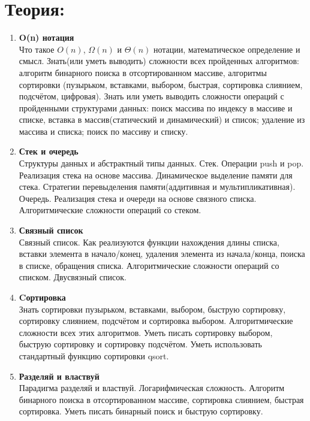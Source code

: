 \documentclass{article}
\begin{document}

\section*{Теория:}
\begin{enumerate}

\item  \textbf{O(n) нотация}\\
Что такое $O(n)$, $\Omega(n)$ и $\Theta(n)$ нотации, математическое определение и смысл.
Знать(или уметь выводить) сложности всех пройденных алгоритмов: алгоритм бинарного поиска в отсортированном массиве, алгоритмы сортировки (пузырьком, вставками, выбором, быстрая, сортировка слиянием, подсчётом, цифровая). Знать или уметь выводить сложности операций с пройденными структурами данных: поиск массива по индексу в массиве и списке, вставка в массив(статический и динамический) и список; удаление из массива и списка; поиск по массиву и списку.\\

\item  \textbf{Стек и очередь}\\
Структуры данных и абстрактный типы данных. Стек. Операции push и pop. Реализация стека на основе массива. Динамическое выделение памяти для стека. Стратегии перевыделения памяти(аддитивная и мультипликативная).  Очередь. Реализация стека и очереди на основе связного списка. Алгоритмические сложности операций со стеком.\\

\item \textbf{Связный список}\\
Связный список. Как реализуются функции нахождения длины списка, вставки элемента в начало/конец, удаления элемента из начала/конца, поиска в списке, обращения списка. Алгоритмические сложности операций со списком. Двусвязный список.\\


\item \textbf{Cортировка}\\
Знать сортировки пузырьком, вставками, выбором, быструю сортировку, сортировку слиянием, подсчётом и сортировка выбором. Алгоритмические сложности всех этих алгоритмов. Уметь писать сортировку выбором, быструю сортировку и сортировку подсчётом. Уметь использовать стандартный функцию сортировки qsort.\\

\item \textbf{Разделяй и властвуй}\\
Парадигма разделяй и властвуй. Логарифмическая сложность. Алгоритм бинарного поиска в отсортированном массиве, сортировка слиянием, быстрая сортировка. Уметь писать бинарный поиск и быструю сортировку.\\


\end{enumerate}
\end{document}

